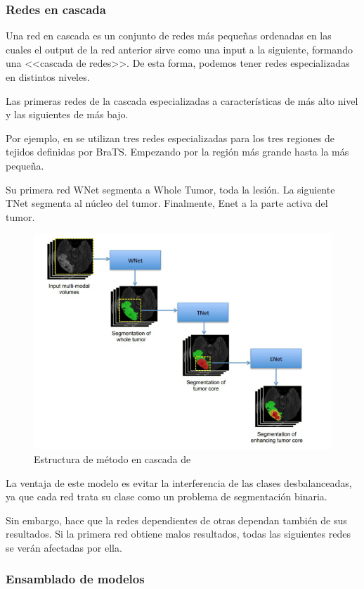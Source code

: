 			\subsubsection{Redes en cascada}
			
			Una red en cascada es un conjunto de redes más pequeñas ordenadas en las cuales el output de la red anterior sirve como una input a la siguiente, formando una  <<cascada de redes>>. De esta forma, podemos tener redes especializadas en distintos niveles. 
			
			Las primeras redes de la cascada especializadas a características de más alto nivel y las siguientes de más bajo.
			
			Por ejemplo, en \cite{wang2018automatic} se utilizan tres redes especializadas para los tres regiones de tejidos definidas por BraTS. Empezando por la región más grande hasta la más pequeña. 
			
			Su primera red WNet segmenta a Whole Tumor, toda la lesión. La siguiente TNet segmenta al núcleo del tumor. Finalmente, Enet a la parte activa del tumor.
			
			
			\begin{figure}[!h]
				\centering
				\includegraphics[width=0.5\linewidth]{imagenes/cascadestructure.png}
				\caption{Estructura de método en cascada de \cite{wang2018automatic}}
			\end{figure}
			
			La ventaja de este modelo es evitar la interferencia de las clases desbalanceadas, ya que cada red trata su clase como un problema de segmentación binaria. 
			
			Sin embargo, hace que la redes dependientes de otras dependan también de sus resultados. Si la primera red obtiene malos resultados, todas las siguientes redes se verán afectadas por ella.
					
			\subsubsection{Ensamblado de modelos}
			
